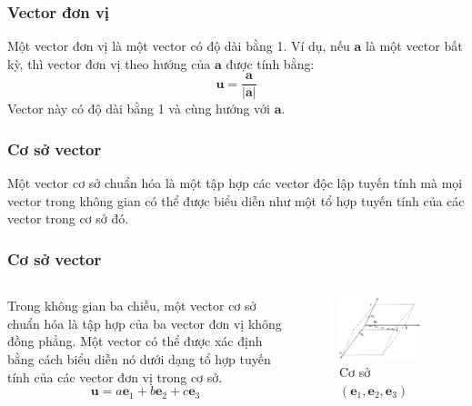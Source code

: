 \begin{frame}
\frametitle{Vector đơn vị}
\begin{tcolorbox}[colback=blue!10, colframe=blue!50!black, title=Định nghĩa]
    Một vector đơn vị là một vector có độ dài bằng 1. Ví dụ, nếu \(\mathbf{a}\) là một vector bất kỳ, thì vector đơn vị theo hướng của \(\mathbf{a}\) được tính bằng:
\begin{equation}
    \mathbf{u} = \frac{\mathbf{a}}{|\mathbf{a}|} 
\end{equation}
Vector này có độ dài bằng 1 và cùng hướng với \(\mathbf{a}\).
\end{tcolorbox}
\end{frame}

\begin{frame}
\frametitle{Cơ sở vector}
\begin{tcolorbox}[colback=blue!10, colframe=blue!50!black, title=Định nghĩa]
    Một vector cơ sở chuẩn hóa là một tập hợp các vector độc lập tuyến tính mà mọi vector trong không gian có thể được biểu diễn như một tổ hợp tuyến tính của các vector trong cơ sở đó.
\end{tcolorbox}
\end{frame}

\begin{frame}
\frametitle{Cơ sở vector}
\begin{columns}
\begin{column}{0.5\textwidth}
Trong không gian ba chiều, một vector cơ sở chuẩn hóa là tập hợp của ba vector đơn vị không đồng phẳng. Một vector có thể được xác định bằng cách biểu diễn nó dưới dạng tổ hợp tuyến tính của các vector đơn vị trong cơ sở.
\begin{equation}
    \mathbf{u}=a\mathbf{e}_1+b\mathbf{e}_2+c\mathbf{e}_3
\end{equation}
\end{column}
\begin{column}{0.5\textwidth}
\begin{figure}
\centering
\includegraphics[width=0.9\textwidth]{Slides/Figure/cosovector.png}
\caption{Cơ sở \((\mathbf{e}_1, \mathbf{e}_2, \mathbf{e}_3)\)}
\end{figure}
\end{column}
\end{columns}
\end{frame}

